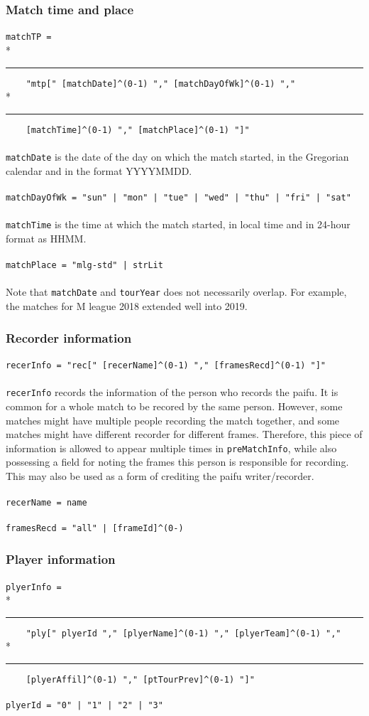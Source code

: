 \documentclass[%
	a4paper%
	,10pt%
	,twoside%
	,notitlepage%
]{article}%
\newcommand*{\ruleSymbol}{\textjapanese{⚠}}%
\newcommand*{\ruleMargin}{\marginpar{\flushright{}\ruleSymbol{}}}%
\newcommand*{\rulePar}{\paragraph*{\ruleMargin{}}}%
\newcommand*{\indentRule}{\rule{10pt}{0pt}}%
\begin{document}
		\subsubsection{Match time and place}%
			\rulePar{}\lstinline/matchTP = /\\*%
			\indentRule{}\lstinline/    "mtp[" [matchDate]^(0-1) "," [matchDayOfWk]^(0-1) "," /\\*%
			\indentRule{}\lstinline/    [matchTime]^(0-1) "," [matchPlace]^(0-1) "]"/%
			\rulePar{}\lstinline/matchDate/ is the date of the day on which the match started, in the Gregorian calendar and in the format YYYYMMDD. %
			\rulePar{}\lstinline/matchDayOfWk = "sun" | "mon" | "tue" | "wed" | "thu" | "fri" | "sat"/%
			\rulePar{}\lstinline/matchTime/ is the time at which the match started, in local time and in 24-hour format as HHMM. %
			\rulePar{}\lstinline/matchPlace = "mlg-std" | strLit/%
			\paragraph*{}Note that \lstinline/matchDate/ and \lstinline/tourYear/ does not necessarily overlap. For example, the matches for M league 2018 extended well into 2019. %
		\subsubsection{Recorder information}%
			\rulePar{}\lstinline/recerInfo = "rec[" [recerName]^(0-1) "," [framesRecd]^(0-1) "]"/%
			\paragraph*{}\lstinline/recerInfo/ records the information of the person who records the paifu. It is common for a whole match to be recored by the same person. However, some matches might have multiple people recording the match together, and some matches might have different recorder for different frames. Therefore, this piece of information is allowed to appear multiple times in \lstinline/preMatchInfo/, while also possessing a field for noting the frames this person is responsible for recording. This may also be used as a form of crediting the paifu writer/recorder. %
			\rulePar{}\lstinline/recerName = name/%
			\rulePar{}\lstinline/framesRecd = "all" | [frameId]^(0-)/%
		\subsubsection{Player information}%
			\rulePar{}\lstinline/plyerInfo = /\\*%
			\indentRule{}\lstinline/    "ply[" plyerId "," [plyerName]^(0-1) "," [plyerTeam]^(0-1) "," /\\*%
			\indentRule{}\lstinline/    [plyerAffil]^(0-1) "," [ptTourPrev]^(0-1) "]"/%
			\rulePar{}\lstinline/plyerId = "0" | "1" | "2" | "3"/%
\end{document}
